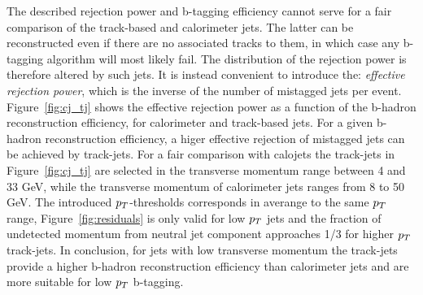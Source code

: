 The described rejection power and b-tagging efficiency cannot serve for a fair  comparison of the track-based and calorimeter jets.
The latter can be reconstructed even if there are no associated tracks to them, in which case any b-tagging algorithm will most likely fail.
The distribution of the rejection power is therefore altered by such jets. It is instead convenient to introduce 
the: \emph{effective rejection power}, which is the inverse of the number of mistagged jets per event. 
Figure~\ref{fig:cj_tj} shows the effective rejection power as a function of the b-hadron reconstruction efficiency, for 
calorimeter and track-based jets. For a given b-hadron reconstruction efficiency,
a higer effective rejection of mistagged jets can be achieved by track-jets.
For a fair comparison with calojets the track-jets in Figure~\ref{fig:cj_tj} are selected in the transverse 
momentum range between 4 and 33 GeV, while the transverse momentum of calorimeter jets 
ranges from 8 to 50 GeV. The introduced $p_{T}$-thresholds corresponds in averange to the same $p_{T}$ range, 
Figure~\ref{fig:residuals} is only valid for low $p_{T}$ jets  and the fraction of undetected 
momentum from neutral jet component  approaches 1/3 for higher $p_{T}$ track-jets.
In conclusion, for jets with low transverse momentum the track-jets provide a higher 
b-hadron reconstruction efficiency than calorimeter jets and are more suitable  for 
low $p_{T}$ b-tagging.

